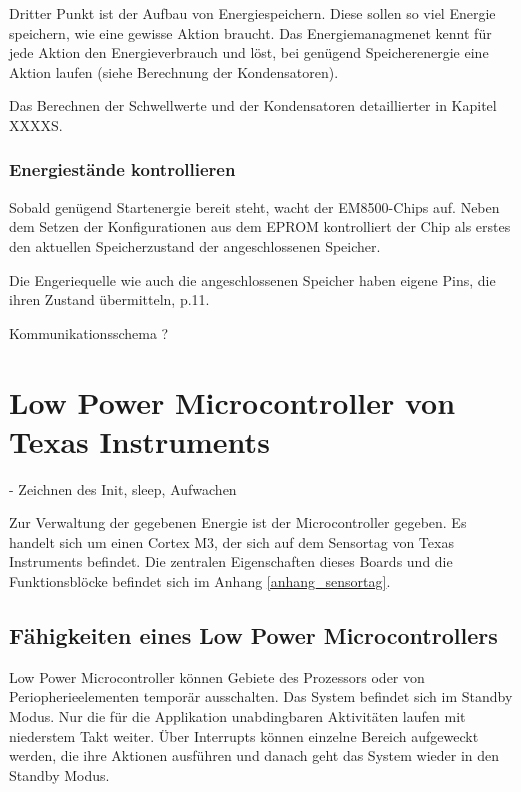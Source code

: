 Dritter Punkt ist der Aufbau von Energiespeichern. Diese sollen so viel Energie speichern, wie eine gewisse Aktion braucht. Das Energiemanagmenet kennt für jede Aktion den Energieverbrauch und löst, bei genügend Speicherenergie eine Aktion laufen (siehe Berechnung der Kondensatoren).

Das Berechnen der Schwellwerte und der Kondensatoren detaillierter in Kapitel XXXXS.






\subsubsection{Energiestände kontrollieren}

Sobald genügend Startenergie bereit steht, wacht der EM8500-Chips auf. Neben dem Setzen der Konfigurationen aus dem EPROM kontrolliert der Chip als erstes den aktuellen Speicherzustand der angeschlossenen Speicher.

Die Engeriequelle wie auch die angeschlossenen Speicher haben eigene Pins, die ihren Zustand übermitteln\cite{datasheet_EM85}, p.11. 

Kommunikationsschema ? 

\section{Low Power Microcontroller von Texas Instruments}
- Zeichnen des Init, sleep, Aufwachen

Zur Verwaltung der gegebenen Energie ist der Microcontroller gegeben. Es handelt sich um einen Cortex M3, der sich auf dem Sensortag von Texas Instruments befindet. Die zentralen Eigenschaften dieses Boards und die Funktionsblöcke befindet sich im Anhang \ref{anhang_sensortag}.

\subsection{Fähigkeiten eines Low Power Microcontrollers}
  
Low Power Microcontroller können Gebiete des Prozessors oder von Periopherieelementen temporär ausschalten. Das System befindet sich im Standby Modus. Nur die für die Applikation unabdingbaren Aktivitäten laufen mit niederstem Takt weiter. Über Interrupts können einzelne Bereich aufgeweckt werden, die ihre Aktionen ausführen und danach geht das System wieder in den Standby Modus.

